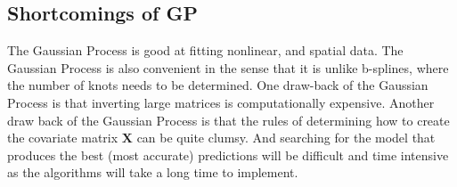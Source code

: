 \documentclass{article}                                                   %
\begin{document}
  \subsection{Shortcomings of GP}
    The Gaussian Process is good at fitting nonlinear, and spatial data.
    The Gaussian Process is also convenient in the sense that it is
    unlike b-splines, where the number of knots needs to be determined.
    One draw-back of the Gaussian Process is that inverting large matrices 
    is computationally expensive. Another draw back of the Gaussian Process
    is that the rules of determining how to create the covariate matrix $\bm X$
    can be quite clumsy. And searching for the model that produces the best 
    (most accurate) predictions will be difficult and time intensive as the
    algorithms will take a long time to implement.
\end{document}
